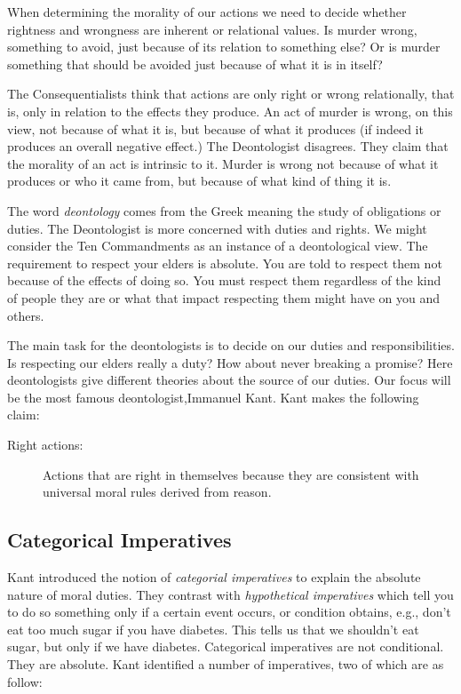 \documentclass[9pt]{article}
\begin{document}
When determining the morality of our actions we need to decide whether
rightness and wrongness are inherent or relational values. Is murder
wrong, something to avoid, just because of its relation to something
else? Or is murder something that should be avoided just because of what
it is in itself?

The Consequentialists think that actions are only right or wrong
relationally, that is, only in relation to the effects they produce. An
act of murder is wrong, on this view, not because of what it is, but
because of what it produces (if indeed it produces an overall negative
effect.) The Deontologist disagrees. They claim that the morality of an
act is intrinsic to it. Murder is wrong not because of what it produces
or who it came from, but because of what kind of thing it is.

The word \emph{deontology} comes from the Greek meaning the study of
obligations or duties. The Deontologist is more concerned with duties
and rights. We might consider the Ten Commandments as an instance of a
deontological view. The requirement to respect your elders is absolute.
You are told to respect them not because of the effects of doing so. You
must respect them regardless of the kind of people they are or what that
impact respecting them might have on you and others.

The main task for the deontologists is to decide on our duties and
responsibilities. Is respecting our elders really a duty? How about
never breaking a promise? Here deontologists give different theories
about the source of our duties. Our focus will be the most famous
deontologist,Immanuel Kant. Kant makes the following claim:

\begin{description}
\item[Right actions:] 
Actions that are right in themselves because they are consistent with universal moral rules derived from reason.
\end{description}

\subsection{Categorical Imperatives}\label{categorical-imperatives}

Kant introduced the notion of \emph{categorial imperatives} to explain
the absolute nature of moral duties. They contrast with
\emph{hypothetical imperatives} which tell you to do so something only
if a certain event occurs, or condition obtains, e.g., don't eat too
much sugar if you have diabetes. This tells us that we shouldn't eat
sugar, but only if we have diabetes. Categorical imperatives are not
conditional. They are absolute. Kant identified a number of imperatives,
two of which are as follow:
\end{document}
